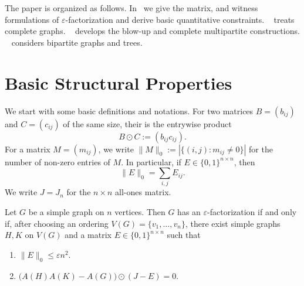 \documentclass{file}
\newcommand{\eps}{\varepsilon}
\begin{document}
The paper is organized as follows.  In~ we give the
matrix, and witness formulations of $\eps$-factorization and derive basic quantitative constraints.  
~ treats
complete graphs.  
~ develops the blow-up and complete multipartite constructions.  ~ considers bipartite
graphs and trees.



\section{Basic Structural Properties}
\label{sec:basic}

We start with some basic definitions and notations.
For two matrices $B=(b_{ij})$ and $C=(c_{ij})$ of the same size,
their  is the entrywise product
\[
  B\odot C := (b_{ij}c_{ij}).
\]
For a matrix $M=(m_{ij})$, we write $\|M\|_0:=|\{(i,j):m_{ij}\neq 0\}|$ for the number of non-zero entries of $M$.  In particular, if
$E\in\{0,1\}^{n\times n}$, then
\[
  \|E\|_0=\sum_{i,j}E_{ij}.
\]
We write $J=J_n$ for the $n\times n$ all-ones matrix.

\begin{lem}
\label{lem:hadamard-form}
Let $G$ be a simple graph on $n$ vertices.  Then $G$ has an
$\eps$-factorization if and only if, after choosing an ordering
$V(G)=\{v_1,\dots,v_n\}$, there exist simple graphs $H,K$ on $V(G)$ and a
matrix $E\in\{0,1\}^{n\times n}$ such that
\begin{enumerate}
\item $\|E\|_0\le \eps n^2$.
\item $ \bigl(A(H)A(K)-A(G)\bigr)\odot (J-E)=0$.
\end{enumerate}
\end{lem}
\end{document}
